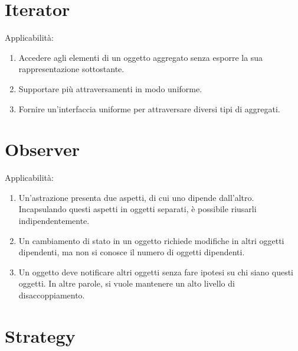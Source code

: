 \documentclass[12pt]{article}
\begin{document}
\section{Iterator}

Applicabilità:
\begin{enumerate}
	\item Accedere agli elementi di un oggetto aggregato senza esporre la sua
	      rappresentazione sottostante.

	\item Supportare più attraversamenti in modo uniforme.

	\item Fornire un'interfaccia uniforme per attraversare diversi tipi di
	      aggregati.
\end{enumerate}

\section{Observer}

Applicabilità:
\begin{enumerate}
	\item Un'astrazione presenta due aspetti, di cui uno dipende dall'altro.
	      Incapsulando questi aspetti in oggetti separati, è possibile riusarli
	      indipendentemente.

	\item Un cambiamento di stato in un oggetto richiede modifiche in altri
	      oggetti dipendenti, ma non si conosce il numero di oggetti dipendenti.

	\item Un oggetto deve notificare altri oggetti senza fare ipotesi su chi
	      siano questi oggetti. In altre parole, si vuole mantenere un alto
	      livello di disaccoppiamento.
\end{enumerate}

\section{Strategy}
\end{document}

